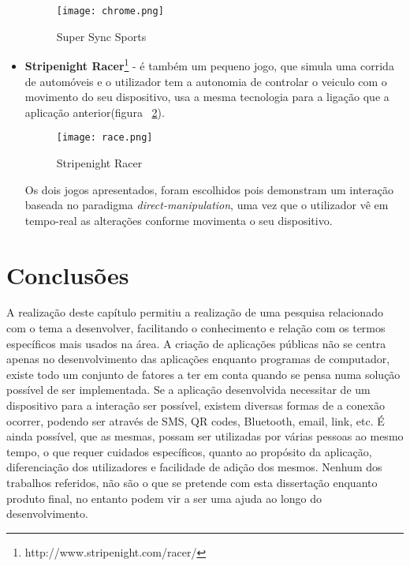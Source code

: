 \begin{itemize}
\begin{figure}[h]
\centering
\texttt{[image: chrome.png]}
\caption {Super Sync Sports}
\label{fig:chrome}
\end{figure}

\item \textbf{Stripenight Racer}\footnote{http://www.stripenight.com/racer/} - é também um pequeno jogo, que simula uma corrida de automóveis e o utilizador tem a autonomia de controlar o veiculo com o movimento do seu dispositivo, usa a mesma tecnologia para a ligação que a aplicação anterior(figura ~\ref{fig:racer}).

\begin{figure}[h]
\centering
\texttt{[image: race.png]}
\caption {Stripenight Racer}
\label{fig:racer}
\end{figure}

Os dois jogos apresentados, foram escolhidos pois demonstram um interação baseada no paradigma \textit{direct-manipulation}, uma vez que o utilizador vê em tempo-real as alterações conforme movimenta o seu dispositivo.


\end{itemize}

\section{Conclusões}

A realização deste capítulo permitiu a realização de uma pesquisa relacionado com o tema a desenvolver, facilitando o conhecimento e relação com os termos específicos mais usados na área.
A criação de aplicações públicas não se centra apenas no desenvolvimento das aplicações enquanto programas de computador, existe todo um conjunto de fatores a ter em conta quando se pensa numa solução possível de ser implementada.
Se a aplicação desenvolvida necessitar de um dispositivo para a interação ser possível, existem diversas formas de a conexão ocorrer, podendo ser através de SMS, QR codes, Bluetooth, email, link, etc.
É ainda possível, que as mesmas, possam ser utilizadas por várias pessoas ao mesmo tempo, o que requer cuidados específicos, quanto ao propósito da aplicação, diferenciação dos utilizadores e facilidade de adição dos mesmos.
Nenhum dos trabalhos referidos, não são o que se pretende com esta dissertação enquanto produto final, no entanto podem vir a ser uma ajuda ao longo do desenvolvimento.


	
